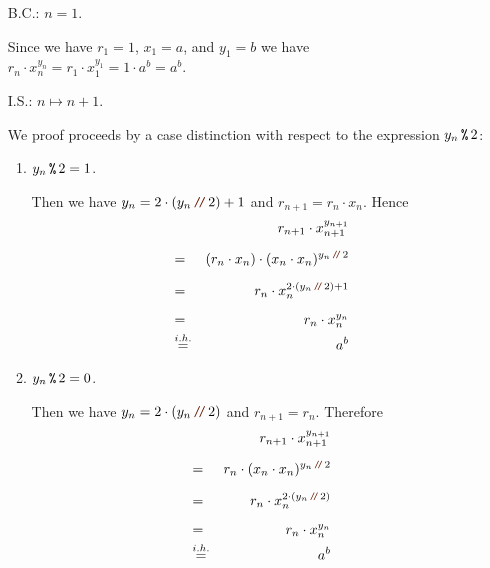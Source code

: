 \begin{enumerate}
\item[B.C.:] $n=1$.

            Since we have $r_1 = 1$, $x_1 = a$, and $y_1 = b$ we have 
            \\[0.2cm]
            \hspace*{1.3cm}
            $r_n \cdot x_n^{y_n} = r_1 \cdot x_1^{y_1} = 1 \cdot a^{b} = a^b$.
\item[I.S.:] $n \mapsto n + 1$.

            We proof proceeds by a case distinction with respect to the expression $y_n \,\texttt{\%}\, 2$:
            \begin{enumerate}
            \item $y_n \,\texttt{\%}\, 2 = 1$.

                  Then we have $y_{n} = 2 \cdot (y_n\dv 2) + 1$ and
                  $r_{n+1} = r_n \cdot x_n$.  Hence
                  \begin{eqnarray*}
                      &   & r_{n+1} \cdot x_{n+1}^{y_{n+1}} \\[0.2cm] 
                      & = & (r_{n} \cdot x_n) \cdot (x_{n} \cdot x_{n})^{y_{n}\dvv 2} \\[0.2cm] 
                      & = & r_{n} \cdot x_n^{2 \cdot (y_{n}\dvv 2) + 1} \\[0.2cm] 
                      & = & r_{n} \cdot x_n^{y_n} \\
                      & \stackrel{i.h.}{=} & a^{b} 
                  \end{eqnarray*}

            \item $y_n \,\texttt{\%}\, 2 = 0$.

                  Then we have $y_{n} = 2 \cdot (y_n\dv 2)$ and $r_{n+1} = r_n$.
                  Therefore
                  \begin{eqnarray*}
                      &   & r_{n+1} \cdot x_{n+1}^{y_{n+1}} \\[0.2cm] 
                      & = & r_{n} \cdot (x_{n} \cdot x_{n})^{y_{n}\dvv 2} \\[0.2cm] 
                      & = & r_{n} \cdot x_n^{2 \cdot (y_{n} \dvv 2)} \\[0.2cm] 
                      & = & r_{n} \cdot x_n^{y_n} \\
                      & \stackrel{i.h.}{=} & a^{b} 
                  \end{eqnarray*}
            \end{enumerate}
\end{enumerate}
